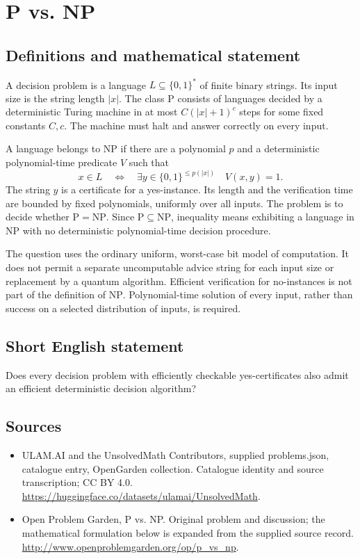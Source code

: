 \documentclass[11pt,a4paper]{article}
\begin{document}
\section*{P vs. NP}\label{statement}

\subsection{Definitions and mathematical statement}
A decision problem is a language $L\subseteq\{0,1\}^*$ of finite
binary strings. Its input size is the string length $|x|$. The class
$\mathrm P$ consists of languages decided by a deterministic Turing
machine in at most $C(|x|+1)^c$ steps for some fixed constants $C,c$.
The machine must halt and answer correctly on every input.

A language belongs to $\mathrm{NP}$ if there are a polynomial $p$
and a deterministic polynomial-time predicate $V$ such that
\[
 x\in L\quad\Longleftrightarrow\quad
 \exists y\in\{0,1\}^{\le p(|x|)}\quad V(x,y)=1.
\]
The string $y$ is a certificate for a yes-instance. Its length and
the verification time are bounded by fixed polynomials, uniformly
over all inputs. The problem is to decide whether
$\mathrm P=\mathrm{NP}$. Since $\mathrm P\subseteq\mathrm{NP}$,
inequality means exhibiting a language in $\mathrm{NP}$ with no
deterministic polynomial-time decision procedure.

The question uses the ordinary uniform, worst-case bit model of
computation. It does not permit a separate uncomputable advice string
for each input size or replacement by a quantum algorithm. Efficient
verification for no-instances is not part of the definition of
$\mathrm{NP}$. Polynomial-time solution of every input, rather than
success on a selected distribution of inputs, is required.
\subsection{Short English statement}
Does every decision problem with efficiently checkable yes-certificates also admit an efficient deterministic decision algorithm?
\subsection{Sources}
\begin{itemize}
\item[S1] ULAM.AI and the UnsolvedMath Contributors, supplied problems.json, catalogue entry, OpenGarden collection. Catalogue identity and source transcription; CC BY 4.0.
\url{https://huggingface.co/datasets/ulamai/UnsolvedMath}.
\item[S2] Open Problem Garden, P vs. NP. Original problem and discussion; the mathematical formulation below is expanded from the supplied source record.
\url{http://www.openproblemgarden.org/op/p_vs_np}.
\end{itemize}
\end{document}
